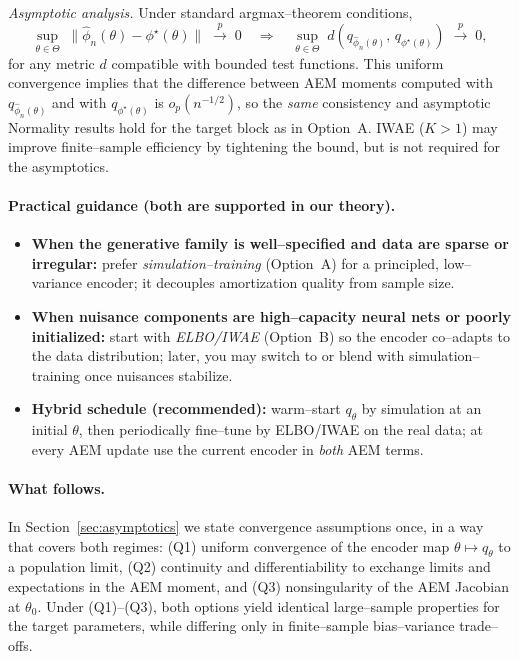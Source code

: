 {\emph{Asymptotic analysis.} Under standard argmax–theorem conditions,
\[
\sup_{\theta \in \Theta} \;
\big\lVert \hat\phi_n(\theta) - \phi^\star(\theta) \big\rVert
\;\xrightarrow{p}\; 0
\quad\Longrightarrow\quad
\sup_{\theta \in \Theta} \; d\!\left(q_{\hat\phi_n(\theta)}, \, q_{\phi^\star(\theta)}\right)
\;\xrightarrow{p}\; 0,
\]
for any metric $d$ compatible with bounded test functions. This uniform convergence implies that the difference between AEM moments computed with $q_{\hat\phi_n(\theta)}$ and with $q_{\phi^\star(\theta)}$ is $o_p(n^{-1/2})$, so the \emph{same} consistency and asymptotic Normality results hold for the target block as in Option~A. IWAE ($K>1$) may improve finite–sample efficiency by tightening the bound, but is not required for the asymptotics.

\paragraph{Practical guidance (both are supported in our theory).}
\begin{itemize}
\item \textbf{When the generative family is well–specified and data are sparse or irregular:} prefer \emph{simulation–training} (Option~A) for a principled, low–variance encoder; it decouples amortization quality from sample size.
\item \textbf{When nuisance components are high–capacity neural nets or poorly initialized:} start with \emph{ELBO/IWAE} (Option~B) so the encoder co–adapts to the data distribution; later, you may switch to or blend with simulation–training once nuisances stabilize.
\item \textbf{Hybrid schedule (recommended):} warm–start $q_\theta$ by simulation at an initial $\theta$, then periodically fine–tune by ELBO/IWAE on the real data; at every AEM update use the current encoder in \emph{both} AEM terms.
\end{itemize}

\paragraph{What follows.}
In Section~\ref{sec:asymptotics} we state convergence assumptions once, in a way that covers both regimes: (Q1) uniform convergence of the encoder map $\theta \mapsto q_\theta$ to a population limit, (Q2) continuity and differentiability to exchange limits and expectations in the AEM moment, and (Q3) nonsingularity of the AEM Jacobian at $\theta_0$. Under (Q1)--(Q3), both options yield identical large–sample properties for the target parameters, while differing only in finite–sample bias–variance trade–offs.


}
